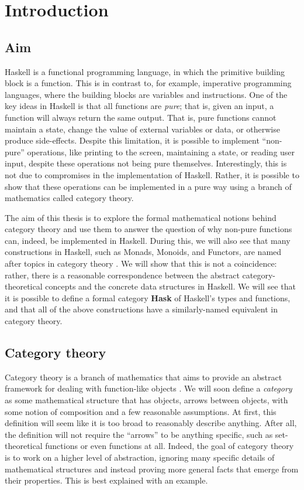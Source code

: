 \documentclass[../thesis.tex]{subfiles}
\begin{document}
\chapter{Introduction}

\section{Aim}

Haskell is a functional programming language, in which the primitive building block is a function.
This is in contrast to, for example, imperative programming languages, where the building blocks are variables and instructions.
One of the key ideas in Haskell is that all functions are \textit{pure}; that is, given an input, a function will always return the same output.
That is, pure functions cannot maintain a state, change the value of external variables or data, or otherwise produce side-effects. 
Despite this limitation, it is possible to implement ``non-pure'' operations, like printing to the screen, maintaining a state, or reading user input, despite these operations not being pure themselves.
Interestingly, this is not due to compromises in the implementation of Haskell.
Rather, it is possible to show that these operations can be implemented in a pure way using a branch of mathematics called category theory.

The aim of this thesis is to explore the formal mathematical notions behind category theory and use them to answer the question of why non-pure functions can, indeed, be implemented in Haskell.
During this, we will also see that many constructions in Haskell, such as Monads, Monoids, and Functors, are named after topics in category theory \cite{haskmooc}.
We will show that this is not a coincidence: rather, there is a reasonable correspondence between the abstract category-theoretical concepts and the concrete data structures in Haskell.
We will see that it is possible to define a formal category \textbf{Hask} of Haskell's types and functions, and that all of the above constructions have a similarly-named equivalent in category theory.


\section{Category theory}

Category theory is a branch of mathematics that aims to provide an abstract framework for dealing with function-like objects \cite{bct}.
We will soon define a \textit{category} as some mathematical structure that has objects, arrows between objects, with some notion of composition and a few reasonable assumptions.
At first, this definition will seem like it is too broad to reasonably describe anything.
After all, the definition will not require the ``arrows'' to be anything specific, such as set-theoretical functions or even functions at all.
Indeed, the goal of category theory is to work on a higher level of abstraction, ignoring many specific details of mathematical structures and instead proving more general facts that emerge from their properties. This is best explained with an example.
\end{document}
